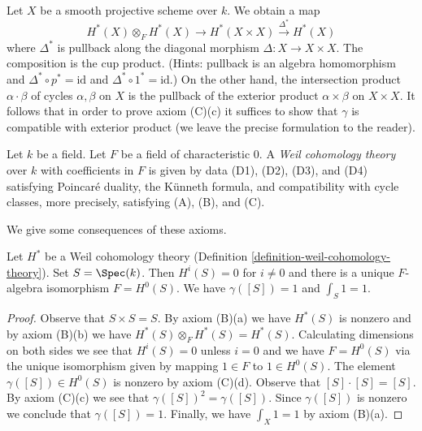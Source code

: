 \begin{remark}
\label{remark-replace-cup-product}
Let $X$ be a smooth projective scheme over $k$. We obtain a map
$$
H^*(X) \otimes_F H^*(X) \longrightarrow H^*(X \times X)
\xrightarrow{\Delta^*} H^*(X)
$$
where $\Delta^*$ is pullback along the diagonal morphism
$\Delta : X \to X \times X$. The composition is the cup product.
(Hints: pullback is an algebra homomorphism and
$\Delta^* \circ p^* = \text{id}$ and $\Delta^* \circ 1^* = \text{id}$.)
On the other hand, the intersection product
$\alpha \cdot \beta$ of cycles $\alpha, \beta$ on $X$ is the
pullback of the exterior product $\alpha \times \beta$ on $X \times X$.
It follows that in order to prove axiom (C)(c) it suffices to show
that $\gamma$ is compatible with exterior product (we leave the
precise formulation to the reader).
\end{remark}

\begin{definition}
\label{definition-weil-cohomology-theory}
Let $k$ be a field. Let $F$ be a field of characteristic $0$.
A {\it Weil cohomology theory} over $k$ with coefficients in $F$
is given by data (D1), (D2), (D3), and (D4) satisfying
Poincar\'e duality, the K\"unneth formula, and compatibility
with cycle classes, more precisely, satisfying (A), (B), and (C).
\end{definition}

\noindent
We give some consequences of these axioms.

\begin{lemma}
\label{lemma-base}
Let $H^*$ be a Weil cohomology theory
(Definition \ref{definition-weil-cohomology-theory}).
Set $S = \Spec(k)$.
Then $H^i(S) = 0$ for $i \not = 0$ and there is a
unique $F$-algebra isomorphism $F = H^0(S)$.
We have $\gamma([S]) = 1$ and
$\int_S 1 = 1$.
\end{lemma}

\begin{proof}
Observe that $S \times S = S$. By axiom (B)(a) we have $H^*(S)$
is nonzero and by axiom (B)(b) we have
$H^*(S) \otimes_F H^*(S) = H^*(S)$. Calculating dimensions on both sides
we see that $H^i(S) = 0$ unless $i = 0$ and we have
$F = H^0(S)$ via the unique isomorphism given by mapping $1 \in F$ to
$1 \in H^0(S)$. The element $\gamma([S]) \in H^0(S)$ is nonzero by
axiom (C)(d). Observe that $[S] \cdot [S] = [S]$. By axiom (C)(c)
we see that $\gamma([S])^2 = \gamma([S])$. Since $\gamma([S])$
is nonzero we conclude that $\gamma([S]) = 1$.
Finally, we have $\int_X 1 = 1$ by axiom (B)(a).
\end{proof}

